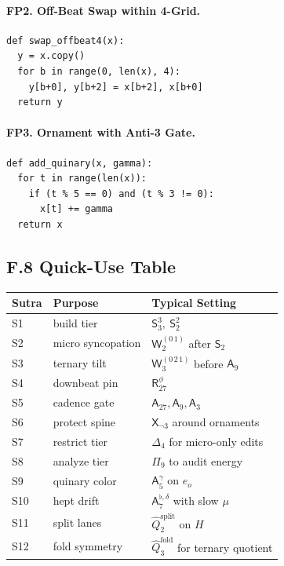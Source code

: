 \documentclass[12pt]{article}
\numberwithin{equation}{section}
\theoremstyle{plain}
\theoremstyle{definition}
\theoremstyle{remark}
\begin{document}
\paragraph{FP2. Off-Beat Swap within 4-Grid.}
\begin{verbatim}
def swap_offbeat4(x):
  y = x.copy()
  for b in range(0, len(x), 4):
    y[b+0], y[b+2] = x[b+2], x[b+0]
  return y
\end{verbatim}

\paragraph{FP3. Ornament with Anti-3 Gate.}
\begin{verbatim}
def add_quinary(x, gamma):
  for t in range(len(x)):
    if (t % 5 == 0) and (t % 3 != 0):
      x[t] += gamma
  return x
\end{verbatim}

\subsection*{F.8 Quick-Use Table}
\begin{center}
\begin{tabular}{lll}
\toprule
Sutra & Purpose & Typical Setting \\
\midrule
S1  & build tier & $\mathsf{S}_3^3,\ \mathsf{S}_2^2$ \\
S2  & micro syncopation & $\mathsf{W}_2^{(0\,1)}$ after $\mathsf{S}_2$ \\
S3  & ternary tilt & $\mathsf{W}_3^{(0\,2\,1)}$ before $\mathsf{A}_9$ \\
S4  & downbeat pin & $\mathsf{R}_{27}^{\phi}$ \\
S5  & cadence gate & $\mathsf{A}_{27},\mathsf{A}_9,\mathsf{A}_3$ \\
S6  & protect spine & $\mathsf{X}_{\neg 3}$ around ornaments \\
S7  & restrict tier & $\Delta_{4}$ for micro-only edits \\
S8  & analyze tier & $\Pi_{9}$ to audit energy \\
S9  & quinary color & $\mathsf{A}_5^{\gamma}$ on $e_o$ \\
S10 & hept drift & $\mathsf{A}_7^{\flat,\delta}$ with slow $\mu$ \\
S11 & split lanes & $\hat{Q}_2^{\mathrm{split}}$ on $H$ \\
S12 & fold symmetry & $\hat{Q}_3^{\mathrm{fold}}$ for ternary quotient \\
\bottomrule
\end{tabular}
\end{center}
\end{document}
